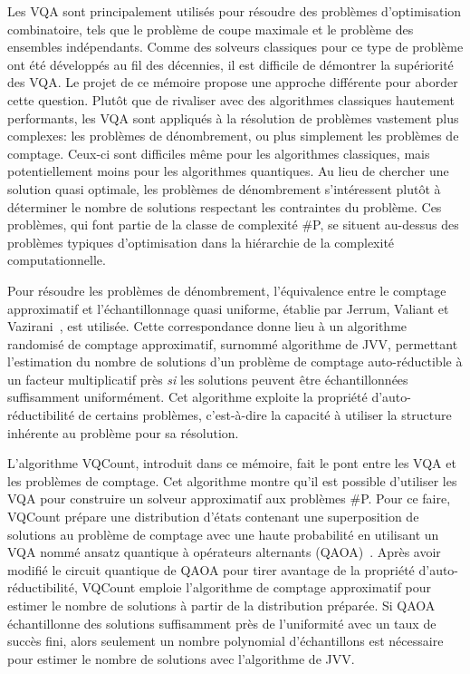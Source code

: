 Les VQA sont principalement utilisés pour résoudre des problèmes d'optimisation combinatoire, tels que le problème de coupe maximale et le problème des ensembles indépendants. Comme des solveurs classiques pour ce type de problème ont été développés au fil des décennies, il est difficile de démontrer la supériorité des VQA. Le projet de ce mémoire propose une approche différente pour aborder cette question. Plutôt que de rivaliser avec des algorithmes classiques hautement performants, les VQA sont appliqués à la résolution de problèmes vastement plus complexes: les problèmes de dénombrement, ou plus simplement les problèmes de comptage. Ceux-ci sont difficiles même pour les algorithmes classiques, mais potentiellement moins pour les algorithmes quantiques. Au lieu de chercher une solution quasi optimale, les problèmes de dénombrement s'intéressent plutôt à déterminer le nombre de solutions respectant les contraintes du problème. Ces problèmes, qui font partie de la classe de complexité \textsf{\#P}, se situent au-dessus des problèmes typiques d'optimisation dans la hiérarchie de la complexité computationnelle.

Pour résoudre les problèmes de dénombrement, l'équivalence entre le comptage approximatif et l'échantillonnage quasi uniforme, établie par Jerrum, Valiant et Vazirani~\cite{jerrumRandomGenerationCombinatorial1986}, est utilisée. Cette correspondance donne lieu à un algorithme randomisé de comptage approximatif, surnommé algorithme de JVV, permettant l'estimation du nombre de solutions d'un problème de comptage auto-réductible à un facteur multiplicatif près \textit{si} les solutions peuvent être échantillonnées suffisamment uniformément. Cet algorithme exploite la propriété d'auto-réductibilité de certains problèmes, c'est-à-dire la capacité à utiliser la structure inhérente au problème pour sa résolution.

L'algorithme VQCount, introduit dans ce mémoire, fait le pont entre les VQA et les problèmes de comptage. Cet algorithme montre qu'il est possible d'utiliser les VQA pour construire un solveur approximatif aux problèmes \textsf{\#P}. Pour ce faire, VQCount prépare une distribution d'états contenant une superposition de solutions au problème de comptage avec une haute probabilité en utilisant un VQA nommé ansatz quantique à opérateurs alternants (QAOA)~\cite{hadfieldQuantumApproximateOptimization2019}. Après avoir modifié le circuit quantique de QAOA pour tirer avantage de la propriété d'auto-réductibilité, VQCount emploie l'algorithme de comptage approximatif pour estimer le nombre de solutions à partir de la distribution préparée. Si QAOA échantillonne des solutions suffisamment près de l'uniformité avec un taux de succès fini, alors seulement un nombre polynomial d'échantillons est nécessaire pour estimer le nombre de solutions avec l'algorithme de JVV. 

